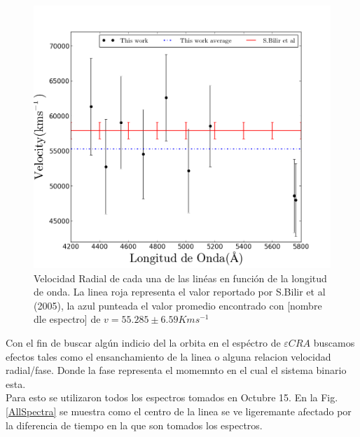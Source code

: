 \documentclass[Proceedings]{ascelike}
\begin{document}
\begin{figure}
\includegraphics[scale=0.5]{radialvelocity.png}
\caption{Velocidad Radial de cada una de las lin\'eas en funci\'on de la longitud de onda. La linea roja representa el valor reportado por S.Bilir et al (2005), la azul punteada el valor promedio encontrado con [nombre dle espectro] de $v=55.285 \pm 6.59 Kms^{-1}$\label{vradial}}
\end{figure}

Con el fin de buscar alg\'un indicio del la orbita en el esp\'ectro de $\varepsilon CRA$ buscamos efectos tales como 
el ensanchamiento de la linea o alguna relacion velocidad radial/fase. Donde la fase representa el momemnto en el cual el 
sistema binario esta.\\

Para esto se utilizaron todos los espectros tomados en Octubre 15. En la Fig.\ref{AllSpectra} se muestra como el centro de la linea se ve ligeremante afectado por la diferencia de tiempo en la que son tomados los espectros.\\
\end{document}
